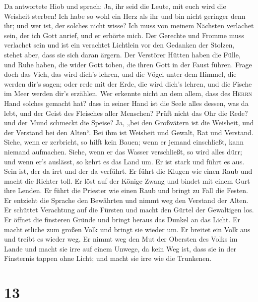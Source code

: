  Da antwortete Hiob und sprach:  Ja, ihr
seid die Leute, mit euch wird die Weisheit sterben!  Ich
habe so wohl ein Herz als ihr und bin nicht geringer denn ihr; und wer
ist, der solches nicht wisse?  Ich muss von meinem
Nächsten verlachet sein, der ich Gott anrief, und er erhörte mich. Der
Gerechte und Fromme muss verlachet sein  und ist ein
verachtet Lichtlein vor den Gedanken der Stolzen, stehet aber, dass sie
sich daran ärgern.  Der Verstörer Hütten haben die Fülle,
und Ruhe haben, die wider Gott toben, die ihren Gott in der Faust
führen.  Frage doch das Vieh, das wird dich's lehren, und
die Vögel unter dem Himmel, die werden dir's sagen;  oder
rede mit der Erde, die wird dich's lehren, und die Fische im Meer werden
dir's erzählen.  Wer erkennte nicht an dem allem, dass des
\textsc{Herrn} Hand solches gemacht hat?  dass in seiner
Hand ist die Seele alles dessen, was da lebt, und der Geist des
Fleisches aller Menschen?  Prüft nicht das Ohr die Rede?
und der Mund schmeckt die Speise?  Ja, „bei den
Großvätern ist die Weisheit, und der Verstand bei den Alten``.
 Bei ihm ist Weisheit und Gewalt, Rat und Verstand.
 Siehe, wenn er zerbricht, so hilft kein Bauen; wenn er
jemand einschließt, kann niemand aufmachen.  Siehe, wenn
er das Wasser verschließt, so wird alles dürr; und wenn er's auslässt,
so kehrt es das Land um.  Er ist stark und führt es aus.
Sein ist, der da irrt und der da verführt.  Er führt die
Klugen wie einen Raub und macht die Richter toll.  Er
löst auf der Könige Zwang und bindet mit einem Gurt ihre Lenden.
 Er führt die Priester wie einen Raub und bringt zu Fall
die Festen.  Er entzieht die Sprache den Bewährten und
nimmt weg den Verstand der Alten.  Er schüttet Verachtung
auf die Fürsten und macht den Gürtel der Gewaltigen los. 
Er öffnet die finsteren Gründe und bringt heraus das Dunkel an das
Licht.  Er macht etliche zum großen Volk und bringt sie
wieder um. Er breitet ein Volk aus und treibt es wieder weg.
 Er nimmt weg den Mut der Obersten des Volks im Lande und
macht sie irre auf einem Unwege, da kein Weg ist,  dass
sie in der Finsternis tappen ohne Licht; und macht sie irre wie die
Trunkenen.

\hypertarget{section-12}{%
\section{13}\label{section-12}}

